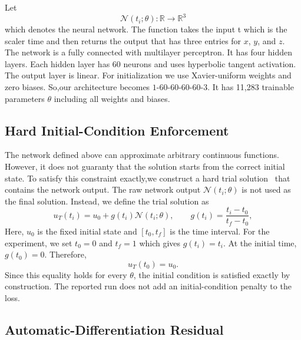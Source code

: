 Let
\begin{equation}
    \mathcal{N}(t_i;\theta):\mathbb{R}\rightarrow\mathbb{R}^{3}
    \label{eq:network-map}
\end{equation}
which denotes the neural network. The function takes the input t which is the scaler time and then returns the output that has three entries for $x$, $y$, and $z$. The network is a fully connected  with multilayer
perceptron. It has four hidden layers. Each hidden layer has 60 neurons and uses
 hyperbolic tangent activation. The output layer is linear. For initialization we use
Xavier-uniform weights and zero biases. So,our architecture becomes $1\text{-}60\text{-}60\text{-}60\text{-}60\text{-}3$. It has 11,283
trainable parameters $\theta$ including all weights and biases.

\subsection{Hard Initial-Condition Enforcement}

The network defined above can approximate arbitrary continuous
functions. However, it does not guaranty that the solution starts from
the correct initial state. To satisfy this constraint exactly,we construct a hard trial solution~\cite{lagaris1998, sukumar2022} that contains the network output. The raw network output $\mathcal{N}(t_i;\theta)$ is not used as the final solution.
 Instead, we define the trial solution as
\begin{equation}
    u_T(t_i)=u_0+g(t_i)\mathcal{N}(t_i;\theta),
    \qquad
    g(t_i)=\frac{t_i-t_0}{t_f-t_0},
    \label{eq:trial-solution}
\end{equation}
Here, $u_0$ is the fixed initial state and $[t_0,t_f]$ is the time interval.
For the experiment, we set  $t_0=0$ and $t_f=1$ which gives $g(t_i)=t_i$. At the initial
time, $g(t_0)=0$. Therefore,
\begin{equation}
    u_T(t_0)=u_0.
    \label{eq:hard-ic}
\end{equation}
Since this equality holds for every \(\theta\), the initial condition is satisfied exactly by construction.
 The reported run does not add an initial-condition
penalty to the loss.

\subsection{Automatic-Differentiation Residual}

